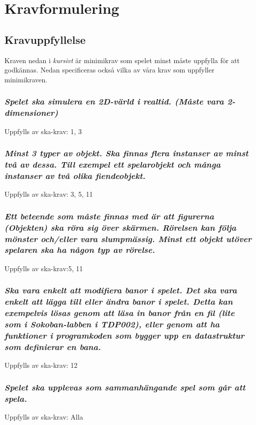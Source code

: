 \documentclass{TDP005mall}
\begin{document}
\section{Kravformulering}
\subsection{Kravuppfyllelse}
Kraven nedan i \emph{kursivt} är minimikrav som spelet minst måste uppfylla för att godkännas. Nedan specificeras också vilka av våra krav som uppfyller minimikraven.

\subsubsection{\emph{ Spelet ska simulera en 2D-värld i realtid. (Måste vara 2-dimensioner)}}
Uppfylls av ska-krav: 1, 3

\subsubsection{\emph{ Minst 3 typer av objekt. Ska finnas flera instanser av minst två av dessa. Till exempel ett spelarobjekt och många instanser av två olika fiendeobjekt.}}
Uppfylls av ska-krav: 3, 5, 11

\subsubsection{\emph{ Ett beteende som måste finnas med är att figurerna (Objekten) ska röra sig över skärmen. Rörelsen kan följa mönster och/eller vara slumpmässig. Minst ett objekt utöver spelaren ska ha någon typ av rörelse.}}
Uppfylls av ska-krav:5, 11

\subsubsection{\emph{ Ska vara enkelt att modifiera banor i spelet. Det ska vara enkelt att lägga till eller ändra banor i spelet. Detta kan exempelvis lösas genom att läsa in banor från en fil (lite som i Sokoban-labben i TDP002), eller genom att ha funktioner i programkoden som bygger upp en datastruktur som definierar en bana. }}
Uppfylls av ska-krav: 12

\subsubsection{\emph{ Spelet ska upplevas som sammanhängande spel som går att spela.}}
Uppfylls av ska-krav: Alla
\end{document}
